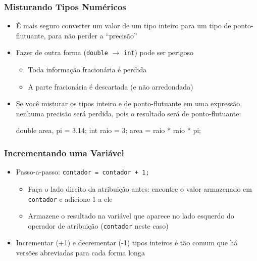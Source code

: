 \documentclass[xcolor={dvipsnames,table},aspectratio=169]{beamer}
\begin{document}
\begin{frame}[fragile]\frametitle{Misturando Tipos Numéricos}
\begin{itemize}
	\item É mais seguro converter um valor de um tipo inteiro para um tipo de ponto-flutuante, para não perder a ``precisão''
	\item Fazer de outra forma (\texttt{double} $\to$ \texttt{int}) pode ser perigoso
	\begin{itemize}
		\item Toda informação fracionária é perdida
		\item A parte fracionária é descartada (e não arredondada)
	\end{itemize}
	\item Se você misturar os tipos inteiro e de ponto-flutuante em uma expressão, nenhuma precisão será perdida, pois o resultado será de ponto-flutuante:
\begin{javacode}
double area, pi = 3.14;
int raio = 3;
area = raio * raio * pi;
\end{javacode}
\end{itemize}
\end{frame}

\begin{frame}\frametitle{Incrementando uma Variável}
\begin{itemize}
	\item Passo-a-passo: \texttt{contador = contador + 1;}
	\begin{itemize}
		\item Faça o lado direito da atribuição antes: encontre o valor armazenado em \texttt{contador} e adicione 1 a ele
		\item Armazene o resultado na variável que aparece no lado esquerdo do operador de atribuição (\texttt{contador} neste caso)
	\end{itemize}
	\item Incrementar (+1) e decrementar (-1) tipos inteiros é tão comum que há versões abreviadas para cada forma longa
\end{itemize}

\begin{center}
\end{center}
\end{frame}
\end{document}
